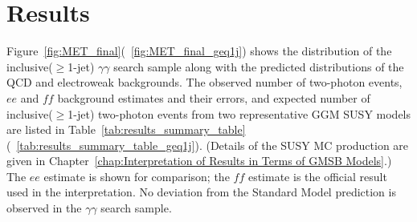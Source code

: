 \documentclass[dissertation.tex]{subfiles}
\begin{document}
%
%

\section{Results}
\label{sec:Results}

Figure~\ref{fig:MET_final}(~\ref{fig:MET_final_geq1j}) shows the \MET distribution of the inclusive($\geq$1-jet) $\gamma\gamma$ search sample along with the predicted \MET distributions of the QCD and electroweak backgrounds.  The observed number of two-photon events, $ee$ and $\mathit{ff}$ background estimates and their errors, and expected number of inclusive($\geq$1-jet) two-photon events from two representative GGM SUSY models are listed in Table~\ref{tab:results_summary_table}(~\ref{tab:results_summary_table_geq1j}).  (Details of the SUSY MC production are given in Chapter~\ref{chap:Interpretation of Results in Terms of GMSB Models}.)  The $ee$ estimate is shown for comparison; the $\mathit{ff}$ estimate is the official result used in the interpretation.  No deviation from the Standard Model prediction is observed in the $\gamma\gamma$ search sample.
\end{document}
